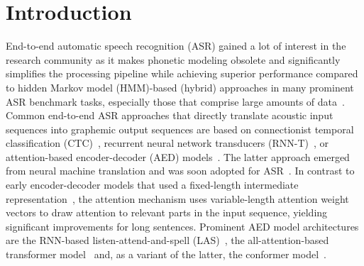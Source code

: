 \documentclass{article}
\begin{document}
\section{Introduction}
	\vspace{-3mm}
End-to-end automatic speech recognition (ASR) gained a lot of interest in the research community as it makes phonetic modeling obsolete and significantly simplifies the processing pipeline while achieving superior performance compared to hidden Markov model (HMM)-based (hybrid) approaches in many prominent ASR benchmark tasks, especially those that comprise large amounts of data~\cite{chiu2018,Karita2019}. Common end-to-end ASR approaches that directly translate acoustic input sequences into graphemic output sequences are based on connectionist temporal classification (CTC)~\cite{Graves2014}, recurrent neural network transducers (RNN-T)~\cite{Graves2013}, or attention-based encoder-decoder (AED) models~\cite{Bahdanau2015}. The latter approach emerged from neural machine translation and was soon adopted for ASR~\cite{Chorowski2015}. In contrast to early encoder-decoder models that used a fixed-length intermediate representation~\cite{Cho2014}, the attention mechanism uses variable-length attention weight vectors to draw attention to relevant parts in the input sequence, yielding significant improvements for long sentences. Prominent AED model architectures are the RNN-based listen-attend-and-spell (LAS)~\cite{chan2016}, the all-attention-based transformer model~\cite{Vaswani2017,Dong2018c} and, as a variant of the latter, the conformer model~\cite{Gulati2020}.
\end{document}

